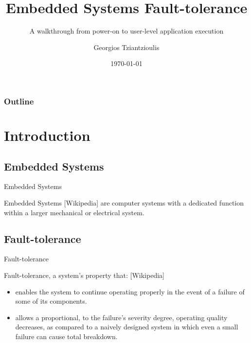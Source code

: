 \documentclass{beamer}
\title[Fault-tolerance on OdroidU3]{Embedded Systems Fault-tolerance}
\subtitle{A walkthrough from power-on to user-level application execution}
\author{Georgios Tziantzioulis}
\institute{Argonne National Laboratory}
\date{\today}
\begin{document}
\begin{frame}

  \titlepage

\end{frame}

\begin{frame}
  \frametitle{Outline}
  \tableofcontents[]
\end{frame}

\section{Introduction}

\subsection{Embedded Systems}
\begin{frame}{Embedded Systems}
  \begin{block}{Embedded Systems [Wikipedia]}
    are computer systems with a dedicated function within a larger mechanical or electrical system.
  \end{block}
\end{frame}


\subsection{Fault-tolerance}
\begin{frame}{Fault-tolerance}
  \begin{block}{Fault-tolerance, a system's property that: [Wikipedia]}
    \begin{itemize}[<+->]
    \item enables the system to continue operating properly in the event of a failure of some of its components.
    \item allows a proportional, to the failure's severity degree, operating quality decreases, as compared to a naively designed system in which even a small failure can cause total breakdown.
    \end{itemize}  
  \end{block}
\end{frame}
\end{document}

